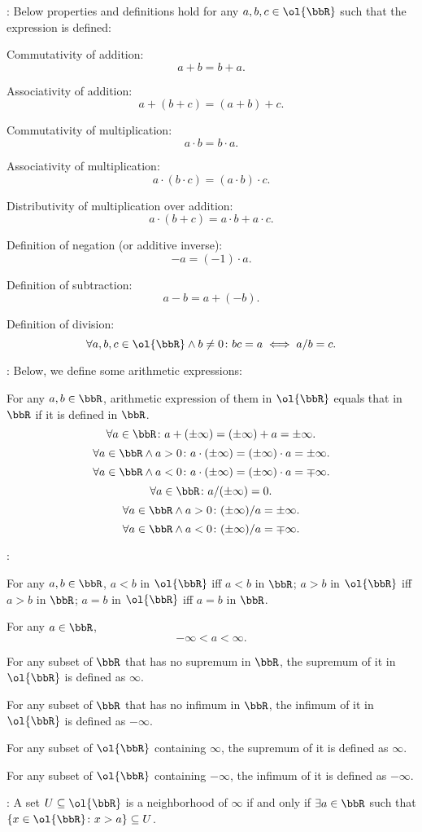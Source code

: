 \documentclass[a4paper,12pt]{report}
\begin{document}
\begin{itemizle}
\bit
\item {}: Below properties and definitions hold for any $a,b,c\in\ol{\bbR}$ such that the expression is defined:
\bit
\item Commutativity of addition:
\[a+b=b+a.\]
\item Associativity of addition:
\[a+(b+c)=(a+b)+c.\]
\item Commutativity of multiplication:
\[a\cdot b=b\cdot a.\]
\item Associativity of multiplication:
\[a\cdot (b\cdot c)=(a\cdot b)\cdot c.\]
\item Distributivity of multiplication over addition:
\[a\cdot (b+c)=a\cdot b+a\cdot c.\]
\item Definition of negation (or additive inverse):
\[-a=(-1)\cdot a.\]
\item Definition of subtraction:
\[a-b=a+(-b).\]
\item Definition of division:
\[\forall a,b,c\in\ol{\bbR}\land b\neq 0\colon bc=a\iff a/b=c.\]
\eit
\item {}: Below, we define some arithmetic expressions:

For any $a,b\in\bbR$, arithmetic expression of them in $\ol{\bbR}$ equals that in $\bbR$ if it is defined in $\bbR$.
\[\forall a\in\bbR\colon a+(\pm\infty)=(\pm\infty)+a=\pm\infty.\]
\[\forall a\in\bbR\land a>0\colon a\cdot(\pm\infty)=(\pm\infty)\cdot a=\pm\infty.\]
\[\forall a\in\bbR\land a<0\colon a\cdot(\pm\infty)=(\pm\infty)\cdot a=\mp\infty.\]
\[\forall a\in\bbR\colon a/(\pm\infty)=0.\]
\[\forall a\in\bbR\land a>0\colon(\pm\infty)/a=\pm\infty.\]
\[\forall a\in\bbR\land a<0\colon(\pm\infty)/a=\mp\infty.\]
\item {}:
\bit
\item For any $a,b\in\bbR$, $a<b$ in $\ol{\bbR}$ iff $a<b$ in $\bbR$; $a>b$ in $\ol{\bbR}$ iff $a>b$ in $\bbR$; $a=b$ in $\ol{\bbR}$ iff $a=b$ in $\bbR$.
\item For any $a\in\bbR$,
\[-\infty<a<\infty.\]
\item For any subset of $\bbR$ that has no supremum in $\bbR$, the supremum of it in $\ol{\bbR}$ is defined as $\infty$.

For any subset of $\bbR$ that has no infimum in $\bbR$, the infimum of it in $\ol{\bbR}$ is defined as $-\infty$.

For any subset of $\ol{\bbR}$ containing $\infty$, the supremum of it is defined as $\infty$.

For any subset of $\ol{\bbR}$ containing $-\infty$, the infimum of it is defined as $-\infty$.
\eit
\item {}: A set $U\subseteq\ol{\bbR}$ is a neighborhood of $\infty$ if and only if $\exists a\in\bbR$ such that $\{x\in\ol{\bbR}\colon x>a\}\subseteq U$.


\end{itemizle}
\end{document}
